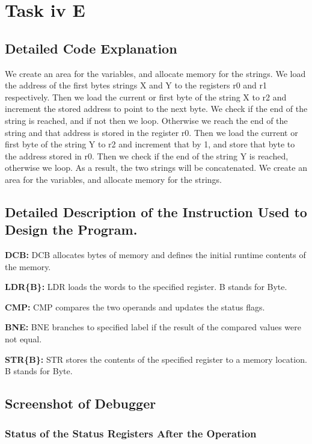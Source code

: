 \documentclass{article}
\begin{document}
\section{Task iv E}

\subsection{Detailed Code Explanation}
 We create an area for the variables, and allocate memory for the strings. We load the address of the first bytes strings X and Y to the registers r0 and r1 respectively. Then we load the current or first byte of the string X to r2 and increment the stored address to point to the next byte. We check if the end of the string is reached, and if not then we loop. Otherwise we reach the end of the string and that address is stored in the register r0. Then we load the current or first byte of the string Y to r2 and increment that by 1, and store that byte to the address stored in r0. Then we check if the end of the string Y is reached, otherwise we loop. As a result, the two strings will be concatenated. We create an area for the variables, and allocate memory for the strings.

\subsection{Detailed Description of the Instruction Used to Design the Program.}

\item \textbf{DCB: }DCB allocates bytes of memory and defines the initial runtime contents of the memory.
\item \textbf{LDR\{B\}: }LDR loads the words to the specified register. B stands for Byte.
\item \textbf{CMP: }CMP compares the two operands and updates the status flags.
\item \textbf{BNE: }BNE branches to specified label if the result of the compared values were not equal.
\item \textbf{STR\{B\}: }STR stores the contents of the specified register to a memory location. B stands for Byte.

\subsection{Screenshot of Debugger}

\subsubsection{Status of the Status Registers After the Operation}
\end{document}
